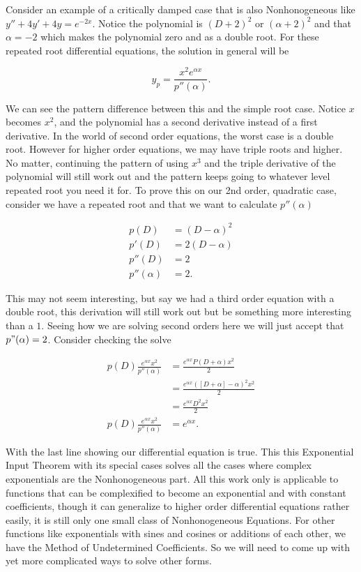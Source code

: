 \documentclass[12pt]{article}
\begin{document}
Consider an example of a critically damped case that is also Nonhonogeneous like $y''+4y'+4y=e^{-2x}$. Notice the polynomial is $(D+2)^2$ or $(\alpha+2)^2$ and that $\alpha=-2$ which makes the polynomial zero and as a double root. For these repeated root differential equations, the solution in general will be

\begin{equation*}
    y_p=\frac{x^2e^{\alpha x}}{p''(\alpha)}.
\end{equation*}

We can see the pattern difference between this and the simple root case. Notice $x$ becomes $x^2$, and the polynomial has a second derivative instead of a first derivative. In the world of second order equations, the worst case is a double root. However for higher order equations, we may have triple roots and higher. No matter, continuing the pattern of using $x^3$ and the triple derivative of the polynomial will still work out and the pattern keeps going to whatever level repeated root you need it for. To prove this on our 2nd order, quadratic case, consider we have a repeated root and that we want to calculate $p''(\alpha)$

\begin{align*}
    p(D) &= (D-\alpha)^2 \\
    p'(D) &= 2(D-\alpha) \\
    p''(D) &= 2 \\
    p''(\alpha)&=2.
\end{align*}

This may not seem interesting, but say we had a third order equation with a double root, this derivation will still work out but be something more interesting than a $1$. Seeing how we are solving second orders here we will just accept that $p"(\alpha)=2$. Consider checking the solve

\begin{align*}
    p(D)\frac{e^{\alpha x}x^2}{p''(\alpha)} &= \frac{e^{\alpha x}P(D+\alpha) x^2}{2} \\
     &= \frac{e^{\alpha x}([D+\alpha]-\alpha)^2 x^2}{2} \\
     &= \frac{e^{\alpha x} D^2 x^2}{2} \\
    p(D)\frac{e^{\alpha x}x^2}{p''(\alpha)} &= e^{\alpha x}.
\end{align*}

With the last line showing our differential equation is true. This this Exponential Input Theorem with its special cases solves all the cases where complex exponentials are the Nonhonogeneous part. All this work only is applicable to functions that can be complexified to become an exponential and with constant coefficients, though it can generalize to higher order differential equations rather easily, it is still only one small class of Nonhonogeneous Equations. For other functions like exponentials with sines and cosines or additions of each other, we have the Method of Undetermined Coefficients. So we will need to come up with yet more complicated ways to solve other forms.
\end{document}
